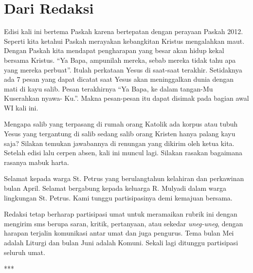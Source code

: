 \newpage

\chapter*{Dari Redaksi}
\footnotesize
{}
Edisi kali ini bertema Paskah karena bertepatan dengan perayaan Paskah 2012. Seperti kita ketahui Paskah merayakan kebangkitan Kristus mengalahkan maut. Dengan Paskah kita mendapat pengharapan yang besar akan hidup kekal bersama Kristus.
\bigskip
``Ya Bapa, ampunilah mereka, sebab mereka tidak
tahu apa yang mereka perbuat''. Itulah perkataan Yesus di saat-saat terakhir. Setidaknya ada 7 pesan yang dapat dicatat saat Yesus akan meninggalkan dunia dengan mati di kayu salib. Pesan terakhirnya ``Ya Bapa, ke dalam tangan-Mu Kuserahkan nyawa-
Ku.''. Makna pesan-pesan itu dapat disimak pada bagian awal WI kali ini.

\bigskip
Mengapa salib yang terpasang di rumah orang Katolik ada korpus atau tubuh Yesus yang tergantung di salib sedang salib orang Kristen hanya palang kayu saja? Silakan temukan jawabannya di renungan yang dikirim oleh ketua kita. 
Setelah edisi lalu cerpen absen, kali ini muncul lagi. Silakan rasakan bagaimana rasanya mabuk harta. 

\bigskip
Selamat kepada warga St. Petrus yang berulangtahun kelahiran dan perkawinan bulan April. Selamat bergabung kepada keluarga R. Mulyadi dalam warga lingkungan St. Petrus. Kami tunggu partisipasinya demi kemajuan bersama.

\bigskip
Redaksi tetap berharap partisipasi umat untuk meramaikan rubrik ini dengan mengirim sms berupa saran, kritik, pertanyaan, atau sekedar \textit{uneg-uneg}, dengan harapan terjalin komunikasi antar umat dan juga pengurus. Tema bulan Mei adalah Liturgi dan bulan Juni adalah Komuni. Sekali lagi ditunggu partisipasi seluruh umat.
\normalsize

\begin{center}***\end{center} 

\vfill

\normalsize

